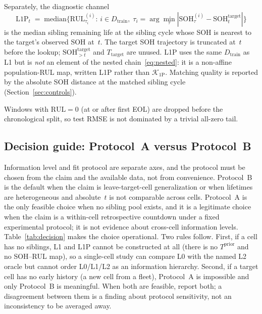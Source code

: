 \documentclass[preprint,12pt]{elsarticle}
\begin{document}
Separately, the diagnostic channel
\begin{equation}
\label{eq:l1p}
\mathrm{L1P}_t \;=\; \mathrm{median}\bigl\{\mathrm{RUL}_{\tau_i}^{(i)}:\, i\in D_{\mathrm{train}},\;
\tau_i=\arg\min_{\tau}|\mathrm{SOH}_\tau^{(i)}-\mathrm{SOH}_t^{\mathrm{target}}|\bigr\}
\end{equation}
is the median sibling remaining life at the sibling cycle whose SOH is nearest to the target's observed SOH at~$t$.
The target SOH trajectory is truncated at~$t$ before the lookup; $\mathrm{SOH}_{>t}^{\mathrm{target}}$ and $T_{\mathrm{target}}$ are unused.
L1P uses the same $D_{\mathrm{train}}$ as L1 but is \emph{not} an element of the nested chain~\eqref{eq:nested}: it is a non-affine population-RUL map, written L1P rather than $\mathcal{K}_{1\mathrm{P}}$.
Matching quality is reported by the absolute SOH distance at the matched sibling cycle (Section~\ref{sec:controls}).

Windows with $\mathrm{RUL}=0$ (at or after first EOL) are dropped before the chronological split, so test RMSE is not dominated by a trivial all-zero tail.

\subsection{Decision guide: Protocol~A versus Protocol~B}
\label{sec:decision}

Information level and fit protocol are separate axes, and the protocol must be chosen from the claim and the available data, not from convenience.
Protocol~B is the default when the claim is leave-target-cell generalization or when lifetimes are heterogeneous and absolute~$t$ is not comparable across cells.
Protocol~A is the only feasible choice when no sibling pool exists, and it is a legitimate choice when the claim is a within-cell retrospective countdown under a fixed experimental protocol; it is not evidence about cross-cell information levels.
Table~\ref{tab:decision} makes the choice operational.
Two rules follow.
First, if a cell has no siblings, L1 and L1P cannot be constructed at all (there is no $T^{\mathrm{prior}}$ and no SOH--RUL map), so a single-cell study can compare L0 with the named L2 oracle but cannot order L0/L1/L2 as an information hierarchy.
Second, if a target cell has no early history (a new cell from a fleet), Protocol~A is impossible and only Protocol~B is meaningful.
When both are feasible, report both; a disagreement between them is a finding about protocol sensitivity, not an inconsistency to be averaged away.
\end{document}
